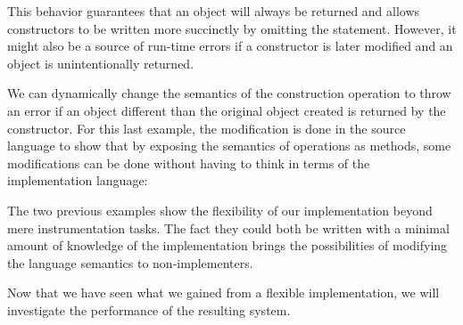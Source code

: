 This behavior guarantees that an object will always be returned and allows
constructors to be written more succinctly by omitting the 
statement. However, it might also be a source of run-time errors if a
constructor is later modified and an object is unintentionally returned.

We can dynamically change the semantics of the construction operation to throw
an error if an object different than the original object created is returned by
the constructor. For this last example, the modification is done in the source
language to show that by exposing the semantics of operations as methods, some
modifications can be done without having to think in terms of the
implementation language:


The two previous examples show the flexibility of our implementation beyond mere
instrumentation tasks. The fact they could both be written with a minimal
amount of knowledge of the implementation brings the possibilities of modifying
the language semantics to non-implementers.

Now that we have seen what we gained from a flexible implementation, we will
investigate the performance of the resulting system.
